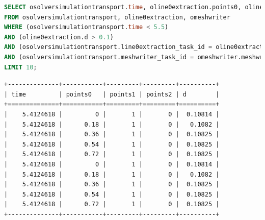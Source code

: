 \begin{minipage}[c]{0.95\textwidth}
\begin{lstlisting}[language=sql,deletendkeywords={TIME},label={lst:experiments-2-sql},caption={[Código em SQL gerado na consulta~\#2]Código em SQL gerado na consulta~\#2 (tempo médio: 15,45~ms).}]
SELECT osolversimulationtransport.time, oline0extraction.points0, oline0extraction.points1, oline0extraction.points2, oline0extraction.d
FROM osolversimulationtransport, oline0extraction, omeshwriter
WHERE (osolversimulationtransport.time < 5.5) 
AND (oline0extraction.d > 0.1) 
AND (osolversimulationtransport.line0extraction_task_id = oline0extraction.line0extraction_task_id) 
AND (osolversimulationtransport.meshwriter_task_id = omeshwriter.meshwriter_task_id)
LIMIT 10;
\end{lstlisting}
\end{minipage}

\begin{lstlisting}[language=sqlresults,label={lst:experiments-2-sqlresults},caption={[Resultados da consulta \#2.]Resultados da consulta \#2 (10 tuplas, tempo médio: 5,92~ms).}]
+--------------+-----------+---------+---------+----------+
| time         | points0   | points1 | points2 | d        |
+==============+===========+=========+=========+==========+
|    5.4124618 |         0 |       1 |       0 |  0.10814 |
|    5.4124618 |      0.18 |       1 |       0 |   0.1082 |
|    5.4124618 |      0.36 |       1 |       0 |  0.10825 |
|    5.4124618 |      0.54 |       1 |       0 |  0.10825 |
|    5.4124618 |      0.72 |       1 |       0 |  0.10825 |
|    5.4124618 |         0 |       1 |       0 |  0.10814 |
|    5.4124618 |      0.18 |       1 |       0 |   0.1082 |
|    5.4124618 |      0.36 |       1 |       0 |  0.10825 |
|    5.4124618 |      0.54 |       1 |       0 |  0.10825 |
|    5.4124618 |      0.72 |       1 |       0 |  0.10825 |
+--------------+-----------+---------+---------+----------+
\end{lstlisting}

